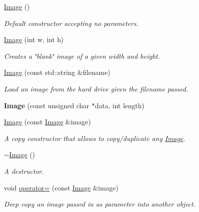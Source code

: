 \begin{DoxyCompactItemize}
\mbox{\label{classImage_a58edd1c45b4faeb5f789b0d036d02313}} 
\hyperlink{classImage_a58edd1c45b4faeb5f789b0d036d02313}{Image} ()
\begin{DoxyCompactList}\small\item\em Default constructor accepting no parameters. \end{DoxyCompactList}\item 
\hyperlink{classImage_a05c964ca59502cc32c30e8ab89b5e920}{Image} (int w, int h)
\begin{DoxyCompactList}\small\item\em Creates a \char`\"{}blank\char`\"{} image of a given width and height. \end{DoxyCompactList}\item 
\hyperlink{classImage_a81e88caba6ef6c0ed639bf1f25e9d441}{Image} (const std\+::string \&filename)
\begin{DoxyCompactList}\small\item\em Load an image from the hard drive given the filename passed. \end{DoxyCompactList}\item 
\mbox{\label{classImage_a7f515a9c20a88c2010a5ace21c263925}} 
{\bfseries Image} (const unsigned char $\ast$data, int length)
\item 
\hyperlink{classImage_a34410a36b132ab597a8878d45facc89a}{Image} (const \hyperlink{classImage}{Image} \&image)
\begin{DoxyCompactList}\small\item\em A copy constructor that allows to copy/duplicate any \hyperlink{classImage}{Image}. \end{DoxyCompactList}\item 
\mbox{\label{classImage_a0294f63700543e11c0f0da85601c7ae5}} 
\hyperlink{classImage_a0294f63700543e11c0f0da85601c7ae5}{$\sim$\+Image} ()
\begin{DoxyCompactList}\small\item\em A destructor. \end{DoxyCompactList}\item 
void \hyperlink{classImage_ae6b1cdd82584ce9fb729c1e062ee088b}{operator=} (const \hyperlink{classImage}{Image} \&image)
\begin{DoxyCompactList}\small\item\em Deep copy an image passed in as parameter into another object. \end{DoxyCompactList}\item 

\end{DoxyCompactItemize}

